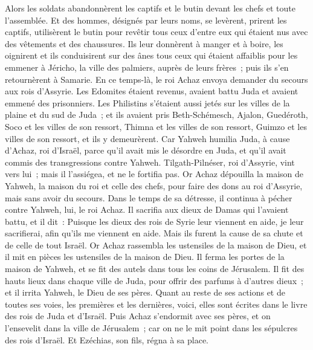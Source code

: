 \begin{multicols}{2}
Alors les soldats abandonnèrent les captifs et le butin devant les chefs et toute l'assemblée.
Et des hommes, désignés par leurs noms, se levèrent, prirent les captifs, utilisèrent le butin pour revêtir tous ceux d'entre eux qui étaient nus avec des vêtements et des chaussures. Ils leur donnèrent à manger et à boire, les oignirent et ils conduisirent sur des ânes tous ceux qui étaient affaiblis pour les emmener à Jéricho, la ville des palmiers, auprès de leurs frères~; puis ils s'en retournèrent à Samarie.
En ce temps-là, le roi Achaz envoya demander du secours aux rois d'Assyrie.
Les Edomites étaient revenus, avaient battu Juda et avaient emmené des prisonniers.
Les Philistins s'étaient aussi jetés sur les villes de la plaine et du sud de Juda~; et ils avaient pris Beth-Schémesch, Ajalon, Guedéroth, Soco et les villes de son ressort, Thimna et les villes de son ressort, Guimzo et les villes de son ressort, et ils y demeurèrent.
Car Yahweh humilia Juda, à cause d'Achaz, roi d'Israël, parce qu'il avait mis le désordre en Juda, et qu'il avait commis des transgressions contre Yahweh.
Tilgath-Pilnéser, roi d'Assyrie, vint vers lui~; mais il l'assiégea, et ne le fortifia pas.
Or Achaz dépouilla la maison de Yahweh, la maison du roi et celle des chefs, pour faire des dons au roi d'Assyrie, mais sans avoir du secours.
Dans le temps de sa détresse, il continua à pécher contre Yahweh, lui, le roi Achaz.
Il sacrifia aux dieux de Damas qui l'avaient battu, et il dit~: Puisque les dieux des rois de Syrie leur viennent en aide, je leur sacrifierai, afin qu'ils me viennent en aide. Mais ils furent la cause de sa chute et de celle de tout Israël.
Or Achaz rassembla les ustensiles de la maison de Dieu, et il mit en pièces les ustensiles de la maison de Dieu. Il ferma les portes de la maison de Yahweh, et se fit des autels dans tous les coins de Jérusalem.
Il fit des hauts lieux dans chaque ville de Juda, pour offrir des parfums à d'autres dieux~; et il irrita Yahweh, le Dieu de ses pères.
Quant au reste de ses actions et de toutes ses voies, les premières et les dernières, voici, elles sont écrites dans le livre des rois de Juda et d'Israël.
Puis Achaz s'endormit avec ses pères, et on l'ensevelit dans la ville de Jérusalem~; car on ne le mit point dans les sépulcres des rois d'Israël. Et Ezéchias, son fils, régna à sa place.

\end{multicols}
